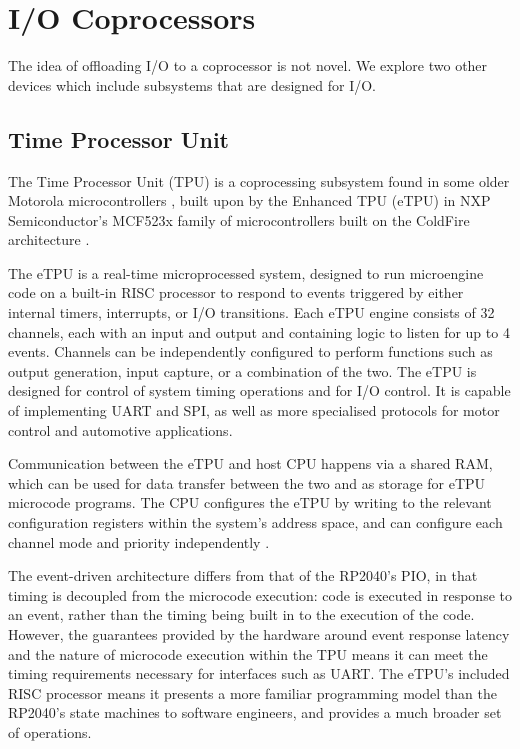 \section{I/O Coprocessors}
The idea of offloading I/O to a coprocessor is not novel. We explore two other devices which include subsystems that are designed for I/O.
\subsection{Time Processor Unit}

The Time Processor Unit (TPU) is a coprocessing subsystem found in some older Motorola microcontrollers \cite{tpu}, built upon by the Enhanced TPU (eTPU) in NXP Semiconductor's MCF523x family of microcontrollers built on the ColdFire architecture \cite{mfcdatasheet}.

The eTPU is a real-time microprocessed system, designed to run microengine code on a built-in RISC processor to respond to events triggered by either internal timers, interrupts, or I/O transitions. Each eTPU engine consists of 32 channels, each with an input and output and containing logic to listen for up to 4 events. Channels can be independently configured to perform functions such as output generation, input capture, or a combination of the two. The eTPU is designed for control of system timing operations and for I/O control. It is capable of implementing UART and SPI, as well as more specialised protocols for motor control and automotive applications.

Communication between the eTPU and host CPU happens via a shared RAM, which can be used for data transfer between the two and as storage for eTPU microcode programs. The CPU configures the eTPU by writing to the relevant configuration registers within the system's address space, and can configure each channel mode and priority independently \cite{etpu}.

The event-driven architecture differs from that of the RP2040's PIO, in that timing is decoupled from the microcode execution: code is executed in response to an event, rather than the timing being built in to the execution of the code. However, the guarantees provided by the hardware around event response latency and the nature of microcode execution within the TPU means it can meet the timing requirements necessary for interfaces such as UART. The eTPU's included RISC processor means it presents a more familiar programming model than the RP2040's state machines to software engineers, and provides a much broader set of operations.

